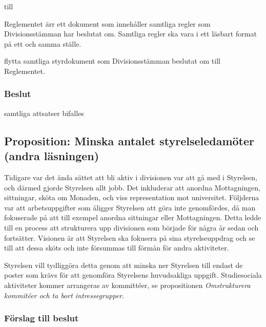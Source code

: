 \documentclass[protokoll]{dvd}
\begin{document}
\begin{attsatser}
	till

	\begin{displayquote}
		Reglementet ärr ett dokument som innehåller samtliga regler som Divisionsstämman har beslutat om.
		Samtliga regler ska vara i ett läsbart format på ett och samma ställe.
	\end{displayquote}

	\item flytta samtliga styrdokument som Divisionsstämman beslutat om till Reglementet.
\end{attsatser}

\subsubsection*{Beslut}
    \begin{attsatser}
        \item samtliga attsatser bifalles
    \end{attsatser}

\newpage
\subsection{Proposition: Minska antalet styrelseledamöter (andra läsningen)}

Tidigare var det ända sättet att bli aktiv i divisionen var att gå med i Styrelsen, och därmed gjorde Styrelsen allt jobb.
Det inkluderar att anordna Mottagningen, sittningar, sköta om Monaden, och viss representation mot universitet.
Följderna var att arbetsuppgifter som åligger Styrelsen att göra inte genomfördes, då man fokuserade på att till exempel anordna sittningar eller Mottagningen.
Detta ledde till en process att strukturera upp divisionen som började för några år sedan och fortsätter.
Visionen är att Styrelsen ska fokusera på sina styrelseuppdrag och se till att dessa sköts och inte försummas till förmån för andra aktiviteter.

Styrelsen vill tydliggöra detta genom att minska ner Styrelsen till endast de poster som krävs för att genomföra Styrelsens huvudsakliga uppgift.
Studiesociala aktiviteter kommer arrangeras av kommittéer, se propositionen \textit{Omstrukturera kommitéer och ta bort intressegrupper}.

\subsubsection*{Förslag till beslut}
\end{document}
